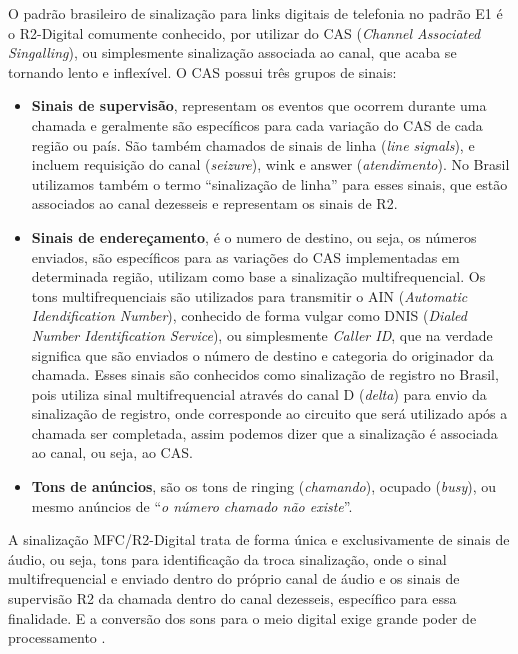 
O padrão brasileiro de sinalização para links digitais de telefonia no padrão E1 é o R2-Digital comumente conhecido, por utilizar do CAS (\textit{Channel Associated Singalling}), ou simplesmente sinalização associada ao canal, que acaba se tornando lento e inflexível. O CAS possui três grupos de sinais: \cite{thiagowinkler2007}

\begin{itemize}
  \item \textbf{Sinais de supervisão}, representam os eventos que ocorrem durante uma chamada e geralmente são específicos para cada variação do CAS de cada região ou país. São também chamados de sinais de linha (\textit{line signals}), e incluem requisição do canal (\textit{seizure}), wink e answer (\textit{atendimento}). No Brasil utilizamos  também o termo “sinalização de linha” para esses sinais, que estão associados ao canal dezesseis e representam os sinais de R2.
  \item \textbf{Sinais de endereçamento}, é o numero de destino, ou seja, os números enviados, são específicos para as variações do CAS implementadas em determinada região, utilizam como base a sinalização multifrequencial. Os tons multifrequenciais são utilizados para transmitir o AIN (\textit{Automatic Idendification Number}), conhecido de forma vulgar como DNIS (\textit{Dialed Number Identification Service}), ou simplesmente \textit{Caller ID}, que na verdade significa que são enviados o número de destino e categoria do originador da chamada. Esses sinais são conhecidos como sinalização de registro no Brasil, pois utiliza sinal multifrequencial através do canal D (\textit{delta}) para envio da sinalização de registro, onde corresponde ao circuito que será utilizado após a chamada ser completada, assim podemos dizer que a sinalização é associada ao canal, ou seja, ao CAS.
  \item \textbf{Tons de anúncios}, são os tons de ringing (\textit{chamando}), ocupado (\textit{busy}), ou mesmo anúncios de “\textit{o número chamado não existe}''.
\end{itemize}

A sinalização MFC/R2-Digital trata de forma única e exclusivamente de sinais de áudio, ou seja, tons para identificação da troca sinalização, onde o sinal multifrequencial e enviado dentro do próprio canal de áudio e os sinais de supervisão R2 da chamada dentro do canal dezesseis, específico para essa finalidade. E a conversão dos sons para o meio digital exige grande poder de processamento \cite{davidson2008}.

